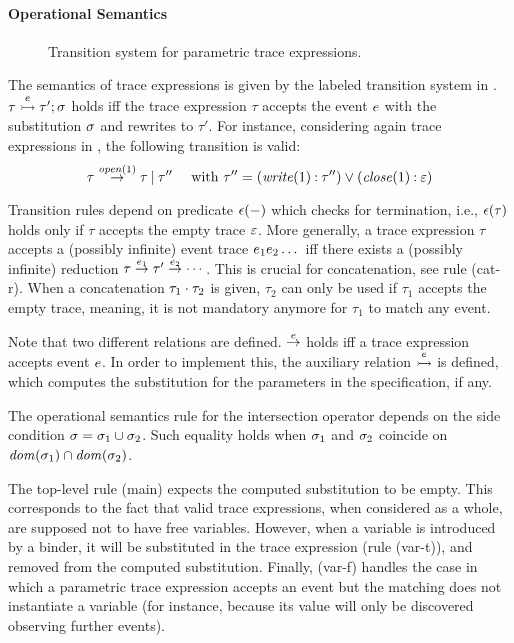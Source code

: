 \paragraph{Operational Semantics}
\begin{figure}[t]

\caption{Transition system for parametric trace expressions.}
\label{fig:semantics}
\end{figure}
The semantics of trace expressions is given by the labeled transition system in .
\( \tau \stackrel{{e}}{\rightarrowtail} \tau';\sigma \) holds iff the trace expression \(\tau\) accepts the event \(e\) with the substitution \(\sigma\) and rewrites to \(\tau'\).
For instance, considering again trace expressions in , the following transition is valid:
\[
  \tau \stackrel{{\mathit{open}(1)}}{\rightarrow} \tau\mathbin{|} \tau'' \quad \mbox{ with }
  \tau''= (\mathit{write}(1) \mathbin{:} \tau'') \mathbin{\vee} (\mathit{close}(1) \mathbin{:} \varepsilon)
\]

Transition rules depend on predicate \(\mathit{\epsilon}(-)\) which checks for termination, i.e., \(\mathit{\epsilon}(\tau)\) holds only if \(\tau\) accepts the empty trace \(\varepsilon\).
More generally, a trace expression \(\tau\) accepts a (possibly infinite) event trace \(e_1e_2\dots\) iff there exists a (possibly infinite) reduction \(\tau \stackrel{{e_1}}{\rightarrow} \tau' \stackrel{{e_2}}{\rightarrow} \dotsb\).
This is crucial for concatenation, see rule (cat-r).
When a concatenation \(\tau_1\mathbin{\cdot}\tau_2\) is given, \(\tau_2\) can only be used if \(\tau_1\) accepts the empty trace, meaning, it is not mandatory anymore for \(\tau_1\) to match any event.

Note that two different relations are defined.
\(\stackrel{{e}}{\rightarrow}\) holds iff a trace expression accepts event \(e\).
In order to implement this, the auxiliary relation \(\stackrel{{e}}{\rightarrowtail}\) is defined, which computes the substitution for the parameters in the specification, if any.

The operational semantics rule for the intersection operator depends on the side condition \(\sigma=\sigma_1\cup\sigma_2\).
Such equality holds when \(\sigma_1\) and \(\sigma_2\) coincide on \(\mathit{dom}(\sigma_1) \cap \mathit{dom}(\sigma_2)\).

The top-level rule (main) expects the computed substitution to be empty.
This corresponds to the fact that valid trace expressions, when considered as a whole, are supposed not to have free variables.
However, when a variable is introduced by a binder, it will be substituted in the trace expression (rule (var-t)), and removed from the computed substitution.
Finally, (var-f) handles the case in which a parametric trace expression accepts an event but the matching does not instantiate a variable (for instance, because its value will only be discovered observing further events).
